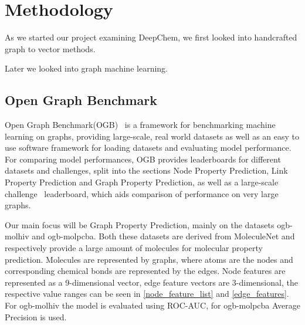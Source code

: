 \section{Methodology}

As we started our project examining DeepChem, we first looked into handcrafted graph to vector methods.

Later we looked into graph machine learning.

\subsection{Open Graph Benchmark}
Open Graph Benchmark(OGB)~\cite{2021ogb} is a framework for benchmarking machine learning on graphs, providing large-scale, real world datasets as well as an easy to use software framework for loading  datasets and evaluating model performance.
For comparing model performances, OGB provides leaderboards for different datasets and challenges, split into the sections Node Property Prediction, Link Property Prediction and Graph Property Prediction, as well as a large-scale challenge~\cite{hu2021ogblsc} leaderboard, which aids comparison of performance on very large graphs.

Our main focus will be Graph Property Prediction, mainly on the datasets ogb-molhiv and ogb-molpcba. Both these datasets are derived from MoleculeNet and respectively provide a large amount of molecules for molecular property prediction. Molecules are represented by graphs, where atoms are the nodes and corresponding chemical bonds are represented by the edges. Node features are represented as a 9-dimensional vector, edge feature vectors are 3-dimensional, the respective value ranges can be seen in \autoref{node_feature_list} and \autoref{edge_features}.
For ogb-molhiv the model is evaluated using ROC-AUC, for ogb-molpcba Average Precision is used.

